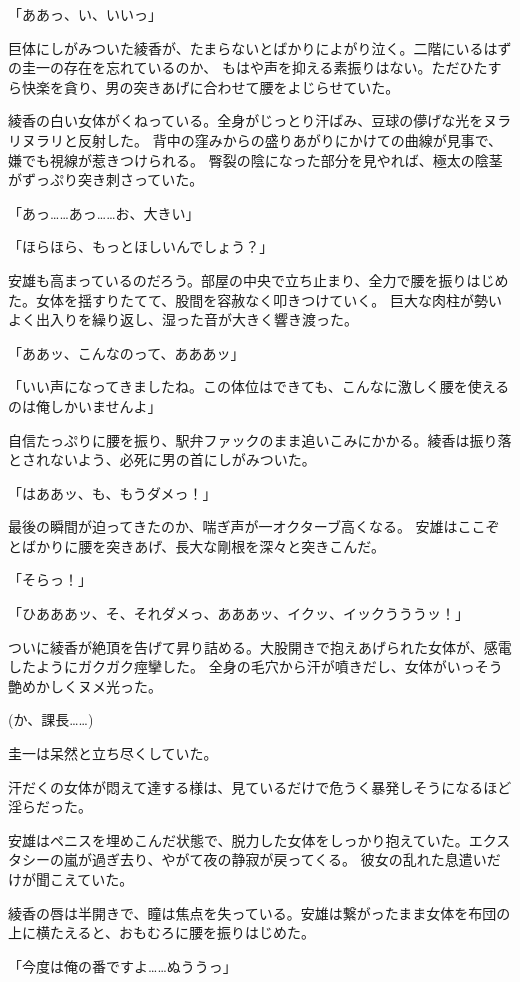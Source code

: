 ﻿\documentclass[
    book,tate,
    line_length=30zw,
    jafontsize=12pt,
    paper=b5j,
    landscape,
    ]{jlreq}
\begin{document}
「ああっ、い、いいっ」

巨体にしがみついた綾香が、たまらないとばかりによがり泣く。二階にいるはずの圭一の存在を忘れているのか、
もはや声を抑える素振りはない。ただひたすら快楽を貪り、男の突きあげに合わせて腰をよじらせていた。

綾香の白い女体がくねっている。全身がじっとり汗ばみ、豆球の儚げな光をヌラリヌラリと反射した。
背中の窪みからの盛りあがりにかけての曲線が見事で、嫌でも視線が惹きつけられる。
臀裂の陰になった部分を見やれば、極太の陰茎がずっぷり突き刺さっていた。

「あっ……あっ……お、大きい」

「ほらほら、もっとほしいんでしょう？」

安雄も高まっているのだろう。部屋の中央で立ち止まり、全力で腰を振りはじめた。女体を揺すりたてて、股間を容赦なく叩きつけていく。
巨大な肉柱が勢いよく出入りを繰り返し、湿った音が大きく響き渡った。

「ああッ、こんなのって、あああッ」

「いい声になってきましたね。この体位はできても、こんなに激しく腰を使えるのは俺しかいませんよ」

自信たっぷりに腰を振り、駅弁ファックのまま追いこみにかかる。綾香は振り落とされないよう、必死に男の首にしがみついた。

「はああッ、も、もうダメっ！」

最後の瞬間が迫ってきたのか、喘ぎ声が一オクターブ高くなる。 安雄はここぞとばかりに腰を突きあげ、長大な剛根を深々と突きこんだ。

「そらっ！」

「ひあああッ、そ、それダメっ、あああッ、イクッ、イックうううッ！」

ついに綾香が絶頂を告げて昇り詰める。大股開きで抱えあげられた女体が、感電したようにガクガク痙攣した。
全身の毛穴から汗が噴きだし、女体がいっそう艶めかしくヌメ光った。

(か、課長……)

圭一は呆然と立ち尽くしていた。

汗だくの女体が悶えて達する様は、見ているだけで危うく暴発しそうになるほど淫らだった。

安雄はペニスを埋めこんだ状態で、脱力した女体をしっかり抱えていた。エクスタシーの嵐が過ぎ去り、やがて夜の静寂が戻ってくる。
彼女の乱れた息遣いだけが聞こえていた。

綾香の唇は半開きで、瞳は焦点を失っている。安雄は繋がったまま女体を布団の上に横たえると、おもむろに腰を振りはじめた。

「今度は俺の番ですよ……ぬううっ」
\end{document}
